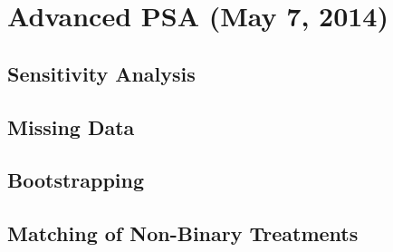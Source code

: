 \documentclass[10pt,slidestop,mathserif,c]{beamer}
\begin{document}
\section{Advanced PSA (May 7, 2014)}

\subsection{Sensitivity Analysis}


\subsection{Missing Data}


\subsection{Bootstrapping}


\subsection{Matching of Non-Binary Treatments}
\end{document}

